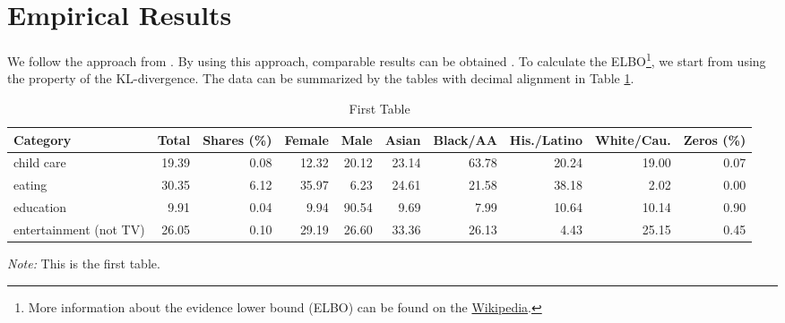 \documentclass[letterpaper]{article}
\begin{document}
\section{Empirical Results}
We follow the approach from \cite{HL2019}. By using this approach, comparable results can be obtained \citep{CES2013}. To calculate the ELBO\footnote{More information about the evidence lower bound (ELBO) can be found on the \href{https://en.wikipedia.org/wiki/Evidence_lower_bound}{Wikipedia}. }, we start from using the property of the KL-divergence. The data can be summarized by the tables with decimal alignment in Table \cref{summary_a}.

\lipsum[107-109]

\renewcommand*\arraystretch{1.5}
\renewcommand{\tabcolsep}{2.5pt}
\begin{table}[H]
  \centering
  \renewcommand{\thetable}{B.\arabic{table}a}
  \caption{First Table}
  \label{summary_a}
  \fontsize{10}{11}\selectfont
  \hspace*{0cm}\begin{tabular}{lrrrrrrrrr}
  \toprule
  Category                   & Total & Shares (\%) & Female & Male  & Asian & Black/AA & His./Latino & White/Cau. & Zeros (\%) \\ \hline
  child care                 & 19.39 & 0.08   & 12.32  & 20.12 & 23.14 & 63.78    & 20.24       & 19.00      & 0.07  \\
  eating                     & 30.35 & 6.12   & 35.97  & 6.23 & 24.61 & 21.58    & 38.18       & 2.02      & 0.00  \\
  education                  & 9.91  & 0.04   & 9.94   & 90.54  & 9.69  & 7.99     & 10.64        & 10.14      & 0.90  \\
  entertainment (not TV)     & 26.05 & 0.10   & 29.19  & 26.60 & 33.36 & 26.13    & 4.43       & 25.15      & 0.45  \\ \bottomrule
\end{tabular}
\hspace*{-0.7cm}
\begin{minipage}{1\textwidth}
  \onehalfspacing
  \vspace*{0.05cm}
  \begin{tablenotes}
    \footnotesize
    \item\textit{Note:} This is the first table.
  \end{tablenotes}
\end{minipage}
\end{table}
\end{document}
